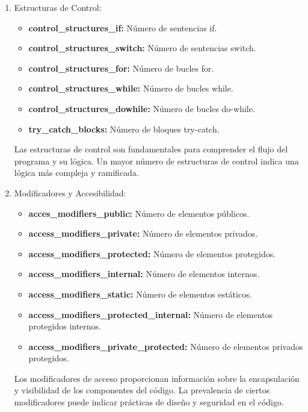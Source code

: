 \begin{enumerate}
    \item Estructuras de Control:
    \begin{itemize}
        \item {\bf control\_structures\_if:} Número de sentencias if.
        \item {\bf control\_structures\_switch:} Número de sentencias switch.
        \item {\bf control\_structures\_for:} Número de bucles for.
        \item {\bf control\_structures\_while:} Número de bucles while.
        \item {\bf control\_structures\_dowhile:} Número de bucles do-while.
        \item {\bf try\_catch\_blocks:} Número de bloques try-catch.
    \end{itemize}
    Las estructuras de control son fundamentales para comprender el flujo del programa y su lógica. Un mayor número de estructuras de control indica una lógica más compleja y ramificada.

    \item Modificadores y Accesibilidad:
    \begin{itemize}
        \item {\bf acces\s_modifiers\_public:} Número de elementos públicos.
        \item {\bf access\_modifiers\_private:} Número de elementos privados.
        \item {\bf access\_modifiers\_protected:} Número de elementos protegidos.
        \item {\bf access\_modifiers\_internal:} Número de elementos internos.
        \item {\bf access\_modifiers\_static:} Número de elementos estáticos.
        \item {\bf access\_modifiers\_protected\_internal:} Número de elementos protegidos internos.
        \item {\bf access\_modifiers\_private\_protected:} Número de elementos privados protegidos.
    \end{itemize}
    Los modificadores de acceso proporcionan información sobre la encapsulación y visibilidad de los componentes del código. La prevalencia de ciertos modificadores puede indicar prácticas de diseño y seguridad en el código.


\end{enumerate}
